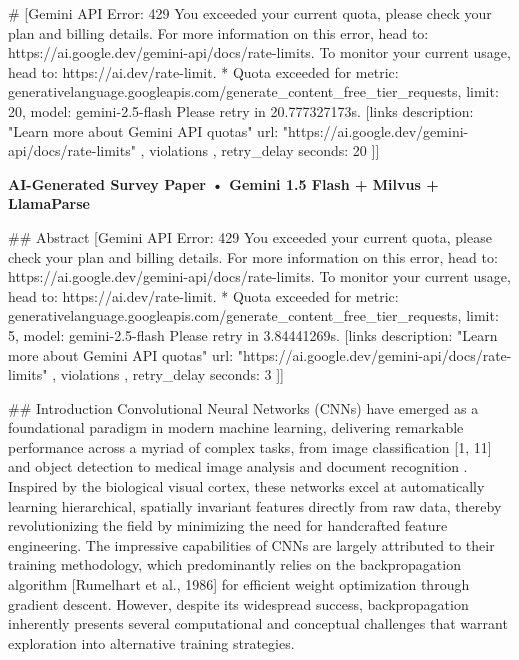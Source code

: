\documentclass{article}
\begin{document}
\author{Artificial Intelligence}
\date{\today}
\maketitle
\noindent
\twocolumn
\# [Gemini API Error: 429 You exceeded your current quota, please check your plan and billing details. For more information on this error, head to: https://ai.google.dev/gemini-api/docs/rate-limits. To monitor your current usage, head to: https://ai.dev/rate-limit.
* Quota exceeded for metric: generativelanguage.googleapis.com/generate_content_free_tier_requests, limit: 20, model: gemini-2.5-flash
Please retry in 20.777327173s. [links {
description: "Learn more about Gemini API quotas"
url: "https://ai.google.dev/gemini-api/docs/rate-limits"
}
, violations {
}
, retry_delay {
seconds: 20
}
]]

\textbf{AI-Generated Survey Paper • Gemini 1.5 Flash + Milvus + LlamaParse}

\#\# Abstract
[Gemini API Error: 429 You exceeded your current quota, please check your plan and billing details. For more information on this error, head to: https://ai.google.dev/gemini-api/docs/rate-limits. To monitor your current usage, head to: https://ai.dev/rate-limit.
* Quota exceeded for metric: generativelanguage.googleapis.com/generate_content_free_tier_requests, limit: 5, model: gemini-2.5-flash
Please retry in 3.84441269s. [links {
description: "Learn more about Gemini API quotas"
url: "https://ai.google.dev/gemini-api/docs/rate-limits"
}
, violations {
}
, retry_delay {
seconds: 3
}
]]

\#\# Introduction
Convolutional Neural Networks (CNNs) have emerged as a foundational paradigm in modern machine learning, delivering remarkable performance across a myriad of complex tasks, from image classification [1, 11] and object detection \cite{18} to medical image analysis \cite{2} and document recognition \cite{13}. Inspired by the biological visual cortex, these networks excel at automatically learning hierarchical, spatially invariant features directly from raw data, thereby revolutionizing the field by minimizing the need for handcrafted feature engineering. The impressive capabilities of CNNs are largely attributed to their training methodology, which predominantly relies on the backpropagation algorithm [Rumelhart et al., 1986] for efficient weight optimization through gradient descent. However, despite its widespread success, backpropagation inherently presents several computational and conceptual challenges that warrant exploration into alternative training strategies.
\end{document}
